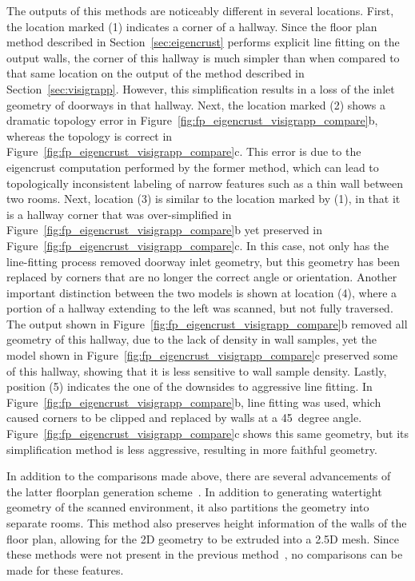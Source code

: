 \documentclass[12pt,onecolumn,oneside]{book}
\begin{document}
The outputs of this methods are noticeably different in several locations.  First, the location marked (1) indicates a corner of a hallway.  Since the floor plan method described in Section~\ref{sec:eigencrust} performs explicit line fitting on the output walls, the corner of this hallway is much simpler than when compared to that same location on the output of the method described in Section~\ref{sec:visigrapp}.  However, this simplification results in a loss of the inlet geometry of doorways in that hallway.  Next, the location marked (2) shows a dramatic topology error in Figure~\ref{fig:fp_eigencrust_visigrapp_compare}b, whereas the topology is correct in Figure~\ref{fig:fp_eigencrust_visigrapp_compare}c.  This error is due to the eigencrust computation performed by the former method, which can lead to topologically inconsistent labeling of narrow features such as a thin wall between two rooms.  Next, location (3) is similar to the location marked by (1), in that it is a hallway corner that was over-simplified in Figure~\ref{fig:fp_eigencrust_visigrapp_compare}b yet preserved in Figure~\ref{fig:fp_eigencrust_visigrapp_compare}c.  In this case, not only has the line-fitting process removed doorway inlet geometry, but this geometry has been replaced by corners that are no longer the correct angle or orientation.  Another important distinction between the two models is shown at location (4), where a portion of a hallway extending to the left was scanned, but not fully traversed.  The output shown in Figure~\ref{fig:fp_eigencrust_visigrapp_compare}b removed all geometry of this hallway, due to the lack of density in wall samples, yet the model shown in Figure~\ref{fig:fp_eigencrust_visigrapp_compare}c preserved some of this hallway, showing that it is less sensitive to wall sample density.  Lastly, position (5) indicates the one of the downsides to aggressive line fitting.  In Figure~\ref{fig:fp_eigencrust_visigrapp_compare}b, line fitting was used, which caused corners to be clipped and replaced by walls at a 45~degree angle.  Figure~\ref{fig:fp_eigencrust_visigrapp_compare}c shows this same geometry, but its simplification method is less aggressive, resulting in more faithful geometry.

In addition to the comparisons made above, there are several advancements of the latter floorplan generation scheme~\cite{Turner14}.  In addition to generating watertight geometry of the scanned environment, it also partitions the geometry into separate rooms.  This method also preserves height information of the walls of the floor plan, allowing for the 2D geometry to be extruded into a 2.5D mesh.  Since these methods were not present in the previous method~\cite{Turner12}, no comparisons can be made for these features.
\end{document}
